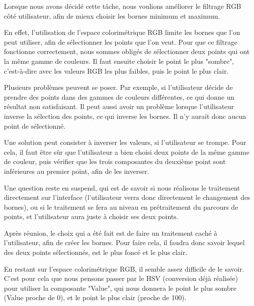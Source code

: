 \documentclass[12pt,titlepage,french]{article}
\begin{document}
Lorsque nous avons décidé cette tâche, nous voulions améliorer le filtrage RGB côté utilisateur, afin de mieux choisir les bornes minimum et maximum. \newline

En effet, l'utilisation de l'espace colorimétrique RGB limite les bornes que l'on peut utiliser, afin de sélectionner les points que l'on veut. Pour que ce filtrage fonctionne correctement, nous sommes obligés de sélectionner deux points qui ont la même gamme de couleurs. Il faut ensuite choisir le point le plus "sombre", c'est-à-dire avec les valeurs RGB les plus faibles, puis le point le plus clair. \newline

Plusieurs problèmes peuvent se poser. Par exemple, si l'utilisateur décide de prendre des points dans des gammes de couleurs différentes, ce qui donne un résultat non satisfaisant. Il peut aussi avoir un problème lorsque l'utilisateur inverse la sélection des points, ce qui inverse les bornes. Il n'y aurait donc aucun point de sélectionné. \newline

Une solution peut consister à inverser les valeurs, si l'utilisateur se trompe. Pour cela, il faut être sûr que l'utilisateur a bien choisi deux points de la même gamme de couleur, puis vérifier que les trois composantes du deuxième point sont inférieures au premier point, afin de les inverser. \newline

Une question reste en suspend, qui est de savoir si nous réalisons le traitement directement sur l'interface (l'utilisateur verra donc directement le changement des bornes), ou si le traitement se fera au niveau en prétraitement du parcours de points, et l'utilisateur aura juste à choisir ses deux points.

Après réunion, le choix qui a été fait est de faire un traitement caché à l'utilisateur, afin de créer les bornes. Pour faire cela, il faudra donc savoir lequel des deux points sélectionnés, est le plus foncé et le plus clair. \newline

En restant sur l'espace colorimétrique RGB, il semble assez difficile de le savoir. C'est pour cela que nous pensons passer par le HSV (conversion déjà réalisée) pour utiliser la composante "Value", qui nous donnera le point le plus sombre (Value proche de 0), et le point le plus clair (proche de 100). \newline
\end{document}

